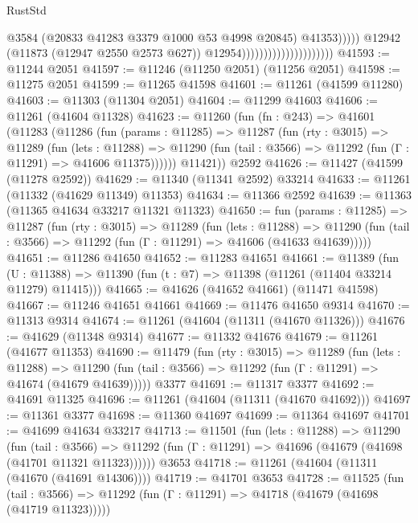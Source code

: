 \begin{lexlean}{RustStd}
\begin{coremodule}
                                                        @3584
                                                        (@20833 @41283 @3379 @1000 @53 @4998 @20845)
                                                        @41353)))))
                                              @12942
                                              (@11873 (@12947 @2550 @2573 @627))
                                              @12954)))))))))))))))))))))
@41593 := @11244 @2051
@41597 := @11246 (@11250 @2051) (@11256 @2051)
@41598 := @11275 @2051
@41599 := @11265 @41598
@41601 := @11261 (@41599 @11280)
@41603 := @11303 (@11304 @2051)
@41604 := @11299 @41603
@41606 := @11261 (@41604 @11328)
@41623 := @11260
    (fun (fn : @243) =>
    @41601
      (@11283
        (@11286
          (fun (params : @11285) =>
          @11287
            (fun (rty : @3015) =>
            @11289
              (fun (lets : @11288) =>
              @11290 (fun (tail : @3566) => @11292 (fun (Γ : @11291) => @41606 @11375))))))
        @11421))
    @2592
@41626 := @11427 (@41599 (@11278 @2592))
@41629 := @11340 (@11341 @2592) @33214
@41633 := @11261 (@11332 (@41629 @11349) @11353)
@41634 := @11366 @2592
@41639 := @11363 (@11365 @41634 @33217 @11321 @11323)
@41650 := fun (params : @11285) =>
  @11287
    (fun (rty : @3015) =>
    @11289
      (fun (lets : @11288) =>
      @11290 (fun (tail : @3566) => @11292 (fun (Γ : @11291) => @41606 (@41633 @41639)))))
@41651 := @11286 @41650
@41652 := @11283 @41651
@41661 := @11389
    (fun (U : @11388) => @11390 (fun (t : @7) => @11398 (@11261 (@11404 @33214 @11279) @11415)))
@41665 := @41626 (@41652 @41661) (@11471 @41598)
@41667 := @11246 @41651 @41661
@41669 := @11476 @41650 @9314
@41670 := @11313 @9314
@41674 := @11261 (@41604 (@11311 (@41670 @11326)))
@41676 := @41629 (@11348 @9314)
@41677 := @11332 @41676
@41679 := @11261 (@41677 @11353)
@41690 := @11479
    (fun (rty : @3015) =>
    @11289
      (fun (lets : @11288) =>
      @11290 (fun (tail : @3566) => @11292 (fun (Γ : @11291) => @41674 (@41679 @41639)))))
    @3377
@41691 := @11317 @3377
@41692 := @41691 @11325
@41696 := @11261 (@41604 (@11311 (@41670 @41692)))
@41697 := @11361 @3377
@41698 := @11360 @41697
@41699 := @11364 @41697
@41701 := @41699 @41634 @33217
@41713 := @11501
    (fun (lets : @11288) =>
    @11290
      (fun (tail : @3566) =>
      @11292 (fun (Γ : @11291) => @41696 (@41679 (@41698 (@41701 @11321 @11323))))))
    @3653
@41718 := @11261 (@41604 (@11311 (@41670 (@41691 @14306))))
@41719 := @41701 @3653
@41728 := @11525
    (fun (tail : @3566) => @11292 (fun (Γ : @11291) => @41718 (@41679 (@41698 (@41719 @11323)))))

\end{coremodule}
\end{lexlean}
